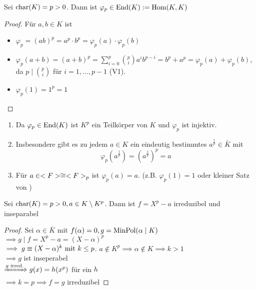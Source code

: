 \begin{proposition}
	Sei $\chara(K) = p > 0$. Dann ist $\varphi_p \in \End(K): =\Hom(K,K)$
\end{proposition}
\begin{proof}
	Für $a, b \in K$ ist
	\begin{itemize}
		\item $\varphi_p = (ab)^p = a^p \cdot b^p = \varphi_p (a) \cdot \varphi_p(b)$
		\item $\varphi_p(a+b) = (a+b)^p = \sum_{i=0}^p\binom{p}{i} a^i b^{p-i} = b^p + a^p = \varphi_p(a) + \varphi_p(b)$, da $p \mid \binom{p}{i}$ für $i = 1, \dots, p-1$ (V1).
		\item $\varphi_p(1) = 1^p = 1$
	\end{itemize}
\end{proof}
\begin{remark}
	\begin{enumerate}
		\item Da $\varphi_p \in \End(K) $ ist $K^p$ ein Teilkörper von $K$ und $\varphi_p$ ist injektiv.
		\item Insbesondere gibt es zu jedem $a \in K$ ein eindeutig bestimmtes $a^{\frac{1}{p}} \in \bar{K}$ mit
		\[
			\varphi_p(a^{\frac{1}{p}}) = (a^{\frac{1}{p}})^p = a
		\]
		\item Für $a \in \F \cong \F_p$ ist $\varphi_p(a) = a$. (z.B. $\varphi_p(1) = 1$ oder kleiner Satz von )
	\end{enumerate}
\end{remark}
\begin{lemma}
	Sei $\chara(K) = p > 0, a \in K \setminus K^p$. Dann ist $f = X^p -a$ irreduzibel und inseparabel
\end{lemma}
\begin{proof}
	Sei $\alpha \in \bar{K}$ mit $f(\alpha) = 0, g= \MinPol(\alpha \mid K)$\\
	$\implies g \mid f = X^p -a = (X-\alpha)^p$\\
	$\implies g \equiv (X - \alpha)^k \mit k \le p$. $a \notin K^p \implies \alpha \notin K \implies k >1$\\
	$\implies g$ ist inseperabel\\
	$\xRightarrow{g \text{ irred.}} g(x) = h(x^p)$ für ein $h$\\
	$\implies k = p \implies f = g$ irreduzibel 
\end{proof}